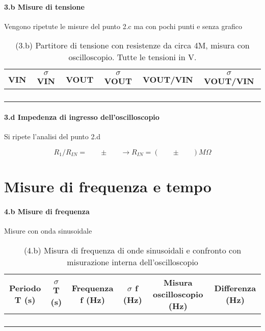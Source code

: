 \documentclass[10pt,a4paper]{article}
\newcommand{\exn}{\phantom{xxx}}
\begin{document}
\paragraph{3.b Misure di tensione} 
Vengono ripetute le misure del punto 2.c  ma con pochi punti e senza grafico
\begin{table}[h]
\centering
\begin{tabular}{|c|c|c|c|c|c|}
\hline 
VIN& $\sigma$ VIN  &VOUT	 & $\sigma$ VOUT& VOUT/VIN & $\sigma$ VOUT/VIN \\
\hline 
\exn & \exn & \exn & \exn & \exn &\exn \\
\exn & \exn & \exn & \exn & \exn &\exn \\
\exn & \exn & \exn & \exn & \exn &\exn \\
\exn & \exn & \exn & \exn & \exn &\exn \\
\hline 
\end{tabular} 
\caption{(3.b) Partitore di tensione con resistenze da circa 4M, misura con oscilloscopio. Tutte le tensioni in V.}
\end{table}


\paragraph{3.d Impedenza di ingresso dell'oscilloscopio} Si ripete l'analisi del punto 2.d

\[ R_1/R_{IN} = \exn  \pm  \exn   \rightarrow  R_{IN} = (\exn \pm  \exn)  M\Omega
\]


\section{Misure di frequenza e tempo}

\paragraph{4.b Misure di frequenza}
Misure con onda sinusoidale
\begin{table}[h]
\centering
\begin{tabular}{|c|c|c|c|c|c|}
\hline 
Periodo T (s)& $\sigma$ T (s)  &Frequenza f (Hz) & $\sigma$ f (Hz) & Misura oscilloscopio (Hz) & Differenza (Hz)\\
\hline 
\exn & \exn & \exn & \exn & \exn &\exn \\
\exn & \exn & \exn & \exn & \exn &\exn \\
\exn & \exn & \exn & \exn & \exn &\exn \\
\exn & \exn & \exn & \exn & \exn &\exn \\
\hline 
\end{tabular} 
\caption{(4.b) Misura di frequenza di onde sinusoidali  e confronto con misurazione interna dell'oscilloscopio }
\end{table}
\end{document}
